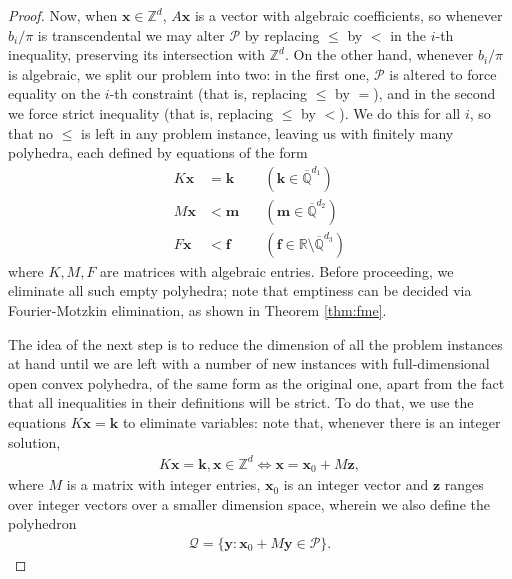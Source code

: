 \begin{proof}
Now, when $\boldsymbol{x} \in \mathbb{Z}^{d}$, $A \boldsymbol{x}$ is a vector with algebraic coefficients, so whenever $b_{i} / \pi$ is transcendental we may alter $\mathcal{P}$ by replacing $\leq$ by $<$ in the $i$-th inequality, preserving its intersection with $\mathbb{Z}^{d}$. On the other hand, whenever $b_{i} / \pi$ is algebraic, we split our problem into two: in the first one, $\mathcal{P}$ is altered to force equality on the $i$-th constraint (that is, replacing $\leq$ by $=$), and in the second we force strict inequality (that is, replacing $\leq$ by $<$). We do this for all $i$, so that no $\leq$ is left in any problem instance, leaving us with finitely many polyhedra, each defined by equations of the form
\begin{align*}
K \boldsymbol{x} &= \boldsymbol{k} \quad &(\boldsymbol{k} \in \overline{\mathbb{Q}}^{d_{1}}) \\
M \boldsymbol{x} &< \boldsymbol{m} \quad &(\boldsymbol{m} \in \overline{\mathbb{Q}}^{d_{2}}) \\
F \boldsymbol{x} &< \boldsymbol{f} \quad &(\boldsymbol{f} \in \mathbb{R} \setminus \overline{\mathbb{Q}}^{d_{3}})
\end{align*}
where $K,M,F$ are matrices with algebraic entries. Before proceeding, we eliminate all such empty polyhedra; note that emptiness can be decided via Fourier-Motzkin elimination, as shown in Theorem \ref{thm:fme}.

The idea of the next step is to reduce the dimension of all the problem instances at hand until we are left with a number of new instances with full-dimensional open convex polyhedra, of the same form as the original one, apart from the fact that all inequalities in their definitions will be strict. To do that, we use the equations $K \boldsymbol{x} = \boldsymbol{k}$ to eliminate variables: note that, whenever there is an integer solution,
\begin{align*}
K \boldsymbol{x} = \boldsymbol{k}, \boldsymbol{x} \in \mathbb{Z}^{d} \Leftrightarrow \boldsymbol{x} = \boldsymbol{x}_{0} + M \boldsymbol{z},
\end{align*}
where $M$ is a matrix with integer entries, $\boldsymbol{x}_{0}$ is an integer vector and $\boldsymbol{z}$ ranges over integer vectors over a smaller dimension space, wherein we also define the polyhedron
\begin{align*}
\mathcal{Q} = \lbrace \boldsymbol{y} : \boldsymbol{x}_{0} + M \boldsymbol{y} \in \mathcal{P} \rbrace .
\end{align*}


\end{proof}
